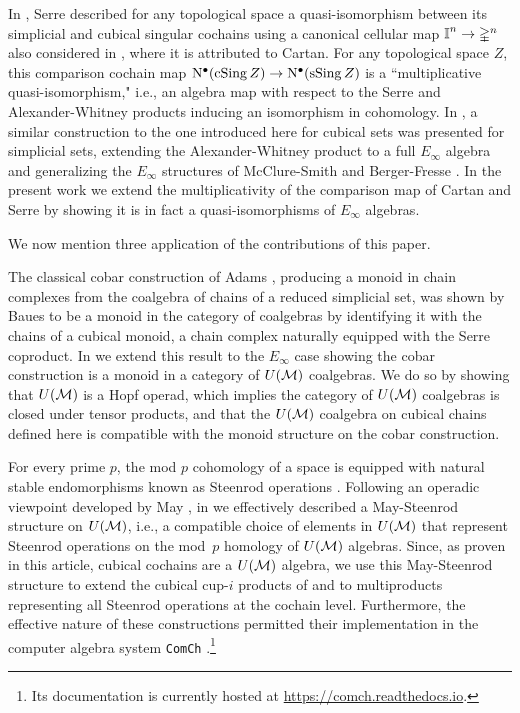 In \cite[p. 442]{Serre1951homologie}, Serre described for any topological space a quasi-isomorphism between its simplicial and cubical singular cochains using a canonical cellular map $\bm{\mathbb{I}}^n \to \mathbb{\Delta}^n$ also considered in \cite[p.199]{Eilenberg1953acyclic}, where it is attributed to Cartan.
For any topological space $Z$, this comparison cochain map $\operatorname{N^{\bullet}}(\operatorname{cSing} Z) \to \operatorname{N^{\bullet}}(\operatorname{sSing} Z)$ is a ``multiplicative quasi-isomorphism," i.e., an algebra map with respect to the Serre and Alexander-Whitney products inducing an isomorphism in cohomology.
In \cite{medina2020prop1}, a similar construction to the one introduced here for cubical sets was presented for simplicial sets, extending the Alexander-Whitney product to a full $E_\infty$ algebra and generalizing the $E_\infty$ structures of McClure-Smith \cite{mcclure2003multivariable} and Berger-Fresse \cite{berger2004combinatorial}.
In the present work we extend the multiplicativity of the comparison map of Cartan and Serre by showing it is in fact a quasi-isomorphisms of $E_\infty$ algebras.

We now mention three application of the contributions of this paper.

The classical cobar construction of Adams \cite{adams1956cobar}, producing a monoid in chain complexes from the coalgebra of chains of a reduced simplicial set, was shown by Baues \cite{baues1998hopf} to be a monoid in the category of coalgebras by identifying it with the chains of a cubical monoid, a chain complex naturally equipped with the Serre coproduct.
In \cite{medina2021cobar} we extend this result to the $E_\infty$ case showing the cobar construction is a monoid in a category of $U(\mathcal{M})$ coalgebras.
We do so by showing that $U(\mathcal{M})$ is a Hopf operad, which implies the category of $U(\mathcal{M})$ coalgebras is closed under tensor products, and that the $U(\mathcal{M})$ coalgebra on cubical chains defined here is compatible with the monoid structure on the cobar construction.

For every prime $p$, the mod $p$ cohomology of a space is equipped with natural stable endomorphisms known as Steenrod operations \cite{steenrod1962cohomology}.
Following an operadic viewpoint developed by May \cite{may1970general}, in \cite{medina2020maysteenrod} we effectively described a May-Steenrod structure on $U(\mathcal{M})$, i.e., a compatible choice of elements in $U(\mathcal{M})$ that represent Steenrod operations on the mod~$p$ homology of $U(\mathcal{M})$ algebras.
Since, as proven in this article, cubical cochains are a $U(\mathcal{M})$ algebra, we use this May-Steenrod structure to extend the cubical cup-$i$ products of \cite{kadeishvili03cup-i} and \cite{pilarczyk2016cubical} to multiproducts representing all Steenrod operations at the cochain level.
Furthermore, the effective nature of these constructions permitted their implementation in the computer algebra system \texttt{ComCh} \cite{medina2021computer}.\footnote{Its documentation is currently hosted at \url{https://comch.readthedocs.io}.}


